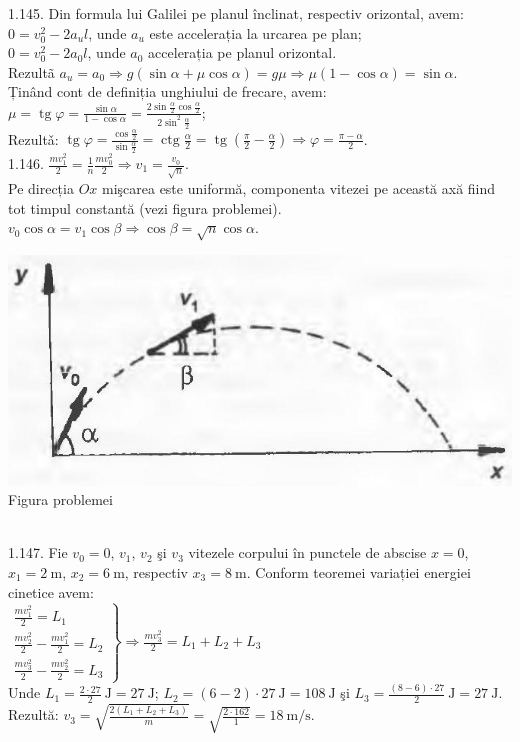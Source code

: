 1.145. Din formula lui Galilei pe planul înclinat, respectiv orizontal, avem:\\ $0=v_{0}^{2}-2 a_{u} l$, unde $a_{u}$ este accelerația la urcarea pe plan;\\ $0=v_{0}^{2}-2 a_{0} l$, unde $a_{0}$ accelerația pe planul orizontal.\\ Rezultã $a_{u}=a_{0} \Rightarrow g(\sin \alpha+\mu \cos \alpha)=g \mu \Rightarrow \mu(1-\cos \alpha)=\sin \alpha$.\\ Ținând cont de definiția unghiului de frecare, avem:\\ $\mu=\operatorname{tg} \varphi=\frac{\sin \alpha}{1-\cos \alpha}=\frac{2 \sin \frac{\alpha}{2} \cos \frac{\alpha}{2}}{2 \sin ^{2} \frac{\alpha}{2}}$;\\ Rezultǎ: $\operatorname{tg} \varphi=\frac{\cos \frac{\alpha}{2}}{\sin \frac{\alpha}{2}}=\operatorname{ctg} \frac{\alpha}{2}=\operatorname{tg}\left(\frac{\pi}{2}-\frac{\alpha}{2}\right) \Rightarrow \varphi=\frac{\pi-\alpha}{2}$.\\

1.146. $\frac{m v_{1}^{2}}{2}=\frac{1}{n} \frac{m v_{0}^{2}}{2} \Rightarrow v_{1}=\frac{v_{0}}{\sqrt{n}}$.\\ Pe direcția $O x$ mişcarea este uniformă, componenta vitezei pe această axă fiind tot timpul constantă (vezi figura problemei).\\ $v_{0} \cos \alpha=v_{1} \cos \beta \Rightarrow \cos \beta=\sqrt{n} \cos \alpha$.\\ \begin{center} \includegraphics[width=0.4\linewidth]{images/2025_07_01_5b3ff9fa0d508c8e9f17g-229}\\ Figura problemei \end{center}\\

1.147. Fie $v_{0}=0$, $v_{1}$, $v_{2}$ şi $v_{3}$ vitezele corpului în punctele de abscise $x=0$, $x_{1}=2 \mathrm{~m}$, $x_{2}=6 \mathrm{~m}$, respectiv $x_{3}=8 \mathrm{~m}$. Conform teoremei variației energiei cinetice avem:\\ $\left.\begin{array}{l} \frac{m v_{1}^{2}}{2}=L_{1}\\ \frac{m v_{2}^{2}}{2}-\frac{m v_{1}^{2}}{2}=L_{2}\\ \frac{m v_{3}^{2}}{2}-\frac{m v_{2}^{2}}{2}=L_{3} \end{array}\right\} \Rightarrow \frac{m v_{3}^{2}}{2}=L_{1}+L_{2}+L_{3}$\\ Unde $L_{1}=\frac{2 \cdot 27}{2} \mathrm{~J}=27 \mathrm{~J}$; $L_{2}=(6-2) \cdot 27 \mathrm{~J}=108 \mathrm{~J}$ şi $L_{3}=\frac{(8-6) \cdot 27}{2} \mathrm{~J}=27 \mathrm{~J}$.\\ Rezultă: $v_{3}=\sqrt{\frac{2\left(L_{1}+L_{2}+L_{3}\right)}{m}}=\sqrt{\frac{2 \cdot 162}{1}}=18 \mathrm{~m} / \mathrm{s}$.\\

